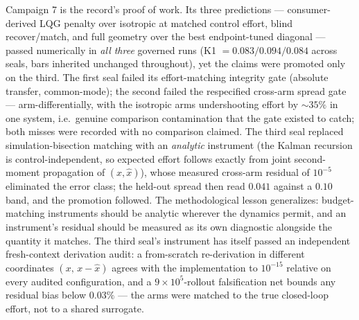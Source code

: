 \documentclass{article}
\theoremstyle{definition}
\theoremstyle{remark}
\begin{document}
Campaign 7 is the record's proof of work. Its three predictions ---
consumer-derived LQG penalty over isotropic at matched control effort,
blind recover/match, and full geometry over the best endpoint-tuned
diagonal --- passed numerically in \emph{all three} governed runs
(K1 $= 0.083/0.094/0.084$ across seals, bars inherited unchanged
throughout), yet the claims were promoted only on the third. The first
seal failed its effort-matching integrity gate (absolute transfer,
common-mode); the second failed the respecified cross-arm spread gate ---
arm-differentially, with the isotropic arms undershooting effort by
${\sim}35\%$ in one system, i.e.\ genuine comparison contamination that
the gate existed to catch; both misses were recorded with no comparison
claimed. The third seal replaced simulation-bisection matching with an
\emph{analytic} instrument (the Kalman recursion is control-independent,
so expected effort follows exactly from joint second-moment propagation of
$(x,\hat x)$), whose measured cross-arm residual of $10^{-5}$ eliminated
the error class; the held-out spread then read $0.041$ against a $0.10$
band, and the promotion followed. The methodological lesson generalizes:
budget-matching instruments should be analytic wherever the dynamics
permit, and an instrument's residual should be measured as its own
diagnostic alongside the quantity it matches. The third seal's instrument
has itself passed an independent fresh-context derivation audit: a
from-scratch re-derivation in different coordinates $(x,\,x-\hat x)$
agrees with the implementation to $10^{-15}$ relative on every audited
configuration, and a $9\times10^{5}$-rollout falsification net bounds any
residual bias below $0.03\%$ --- the arms were matched to the true
closed-loop effort, not to a shared surrogate.
\end{document}
